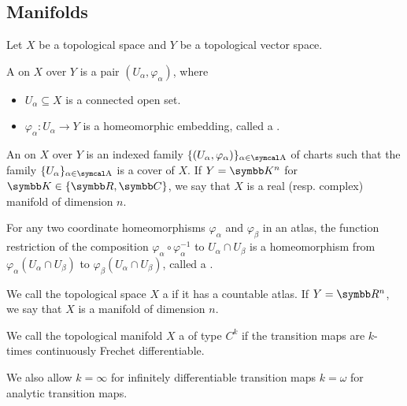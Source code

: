 \subsection{Manifolds}\label{subsec:manifolds}

\begin{definition}\label{def:atlas}\cite[definition 12.1]{Иванов2017}
  Let \( X \) be a topological space and \( Y \) be a topological vector space.

  A  on \( X \) over \( Y \) is a pair \( (U_\alpha, \varphi_\alpha) \), where
  \begin{itemize}
    \item \( U_\alpha \subseteq X \) is a connected open set.
    \item \( \varphi_\alpha: U_\alpha \to Y \) is a homeomorphic embedding, called a .
  \end{itemize}

  An  on \( X \) over \( Y \) is an indexed family \( \{ (U_\alpha, \varphi_\alpha) \}_{\alpha \in \A} \) of charts such that the family \( \{ U_\alpha \}_{\alpha \in \A} \) is a cover of \( X \). If \( Y = \K^n \) for \( \K \in \{ \R, \C \} \), we say that \( X \) is a real (resp. complex) manifold of dimension \( n \).

  For any two coordinate homeomorphisms \( \varphi_\alpha \) and \( \varphi_\beta \) in an atlas, the function restriction of the composition \( \varphi_\alpha \circ \varphi_\alpha^{-1} \) to \( U_\alpha \cap U_\beta \) is a homeomorphism from \( \varphi_\alpha(U_\alpha \cap U_\beta) \) to \( \varphi_\beta(U_\alpha \cap U_\beta) \), called a .
\end{definition}

\begin{definition}\label{def:topological_manifold}\cite[definition 12.4]{Иванов2017}
  We call the topological space \( X \) a  if it has a countable atlas. If \( Y = \R^n \), we say that \( X \) is a manifold of dimension \( n \).
\end{definition}

\begin{definition}\label{def:differentiable_manifold}\cite[definition 12.6]{Иванов2017}
  We call the topological manifold \( X \) a  of type \( C^k \) if the transition maps are \( k \)-times continuously Frechet differentiable.

  We also allow \( k = \infty \) for infinitely differentiable transition maps \( k = \omega \) for analytic transition maps.
\end{definition}
